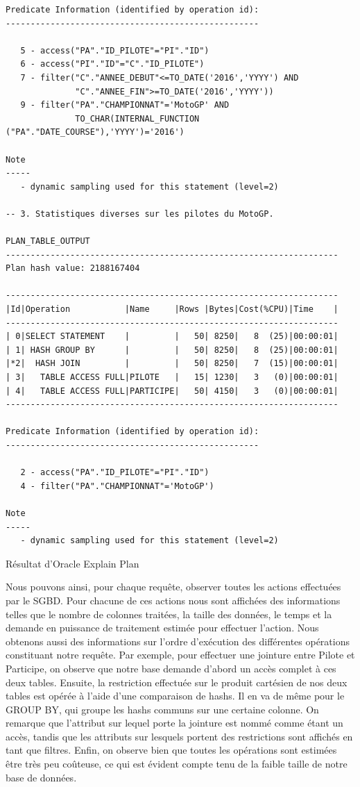 \documentclass[12pt,a4paper]{article}
\newenvironment{code}{\captionsetup{type=listing}}{}
\begin{document}
\begin{code}
\begin{verbatim}
Predicate Information (identified by operation id):
---------------------------------------------------

   5 - access("PA"."ID_PILOTE"="PI"."ID")
   6 - access("PI"."ID"="C"."ID_PILOTE")
   7 - filter("C"."ANNEE_DEBUT"<=TO_DATE('2016','YYYY') AND
              "C"."ANNEE_FIN">=TO_DATE('2016','YYYY'))
   9 - filter("PA"."CHAMPIONNAT"='MotoGP' AND
              TO_CHAR(INTERNAL_FUNCTION ("PA"."DATE_COURSE"),'YYYY')='2016')

Note
-----
   - dynamic sampling used for this statement (level=2)

-- 3. Statistiques diverses sur les pilotes du MotoGP.

PLAN_TABLE_OUTPUT
-------------------------------------------------------------------
Plan hash value: 2188167404

-------------------------------------------------------------------
|Id|Operation           |Name     |Rows |Bytes|Cost(%CPU)|Time    |
-------------------------------------------------------------------
| 0|SELECT STATEMENT    |         |   50| 8250|   8  (25)|00:00:01|
| 1| HASH GROUP BY      |         |   50| 8250|   8  (25)|00:00:01|
|*2|  HASH JOIN         |         |   50| 8250|   7  (15)|00:00:01|
| 3|   TABLE ACCESS FULL|PILOTE   |   15| 1230|   3   (0)|00:00:01|
| 4|   TABLE ACCESS FULL|PARTICIPE|   50| 4150|   3   (0)|00:00:01|
-------------------------------------------------------------------

Predicate Information (identified by operation id):
---------------------------------------------------

   2 - access("PA"."ID_PILOTE"="PI"."ID")
   4 - filter("PA"."CHAMPIONNAT"='MotoGP')

Note
-----
   - dynamic sampling used for this statement (level=2)

    \end{verbatim}
    \caption{Résultat d'Oracle Explain Plan}
    \label{lst.expplan.res}
\end{code}

Nous pouvons ainsi, pour chaque requête, observer toutes les actions effectuées
par le SGBD. Pour chacune de ces actions nous sont affichées des informations telles
que le nombre de colonnes traitées, la taille des données, le temps et la
demande en puissance de traitement estimée pour effectuer l’action. Nous obtenons
aussi des informations sur l’ordre d’exécution des différentes opérations
constituant notre requête. Par exemple, pour effectuer une jointure entre Pilote
et Participe, on observe que notre base demande d’abord un accès complet à ces
deux tables. Ensuite, la restriction effectuée sur le produit cartésien de nos
deux tables est opérée à l’aide d’une comparaison de hashs. Il en va de même
pour le GROUP BY, qui groupe les hashs communs sur une certaine colonne. On
remarque que l'attribut sur lequel porte la jointure est nommé comme étant un
accès, tandis que les attributs sur lesquels portent des restrictions sont
affichés en tant que filtres. Enfin, on observe bien que toutes les opérations
sont estimées être très peu coûteuse, ce qui est évident compte tenu de la
faible taille de notre base de données.
\end{document}
